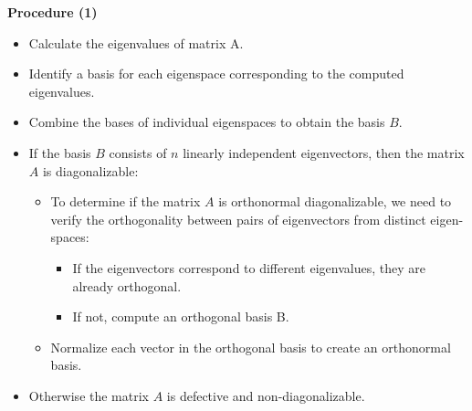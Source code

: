 \documentclass{article}
\begin{document}
\begin{recap}
    \textbf{Procedure (1)}
    \begin{itemize}
        \item Calculate the eigenvalues of matrix A.
        \item Identify a basis for each eigenspace corresponding to the computed
            eigenvalues. 
        \item Combine the bases of individual eigenspaces to obtain the basis
            $B$.
        \item If the basis $B$ consists of $n$ linearly independent eigenvectors,
            then the matrix $A$ is diagonalizable:
            \begin{itemize}
                \item To determine if the matrix $A$ is orthonormal
                    diagonalizable, we need to verify the orthogonality
                    between pairs of eigenvectors from distinct eigen-spaces:
                    \begin{itemize}
                        \item If the eigenvectors correspond to different eigenvalues,
                            they are already orthogonal.
                        \item If not, compute an orthogonal basis B.
                    \end{itemize}
                \item Normalize each vector in the orthogonal basis to create an orthonormal
                    basis.
            \end{itemize}
        \item Otherwise the matrix $A$ is defective and non-diagonalizable.
    \end{itemize}
\end{recap}
\end{document}
